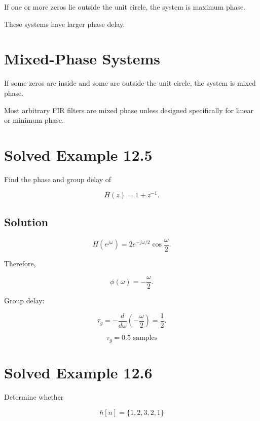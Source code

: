 If one or more zeros lie outside the unit circle, the system is maximum phase.

These systems have larger phase delay.


\section{Mixed-Phase Systems}

If some zeros are inside and some are outside the unit circle, the system is mixed
phase.

Most arbitrary FIR filters are mixed phase unless designed specifically for linear
or minimum phase.


\section{Solved Example 12.5}

Find the phase and group delay of

\[
H(z)=1+z^{-1}.
\]


\subsection{Solution}

\[
H(e^{j\omega})=
2e^{-j\omega/2}\cos\frac{\omega}{2}.
\]

Therefore,

\[
\phi(\omega)=-\frac{\omega}{2}.
\]

Group delay:

\[
\tau_g=
-\frac{d}{d\omega}\left(-\frac{\omega}{2}\right)
=
\frac12.
\]

\[
\boxed{
\tau_g=0.5\text{ samples}
}
\]


\section{Solved Example 12.6}

Determine whether

\[
h[n]=\{1,2,3,2,1\}
\]

